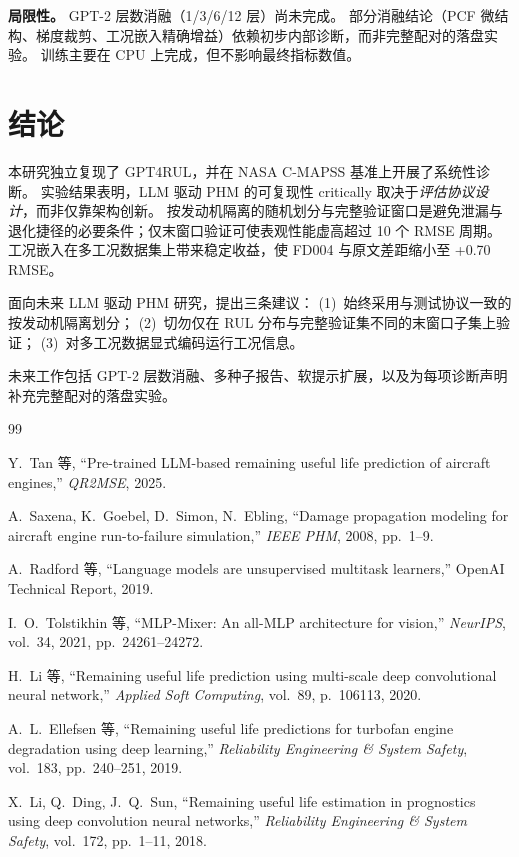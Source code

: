 \documentclass[UTF8,a4paper,10pt,twocolumn]{ctexart}
\begin{document}
\textbf{局限性。}
GPT-2 层数消融（1/3/6/12 层）尚未完成。
部分消融结论（PCF 微结构、梯度裁剪、工况嵌入精确增益）依赖初步内部诊断，而非完整配对的落盘实验。
训练主要在 CPU 上完成，但不影响最终指标数值。

\section{结论}

本研究独立复现了 GPT4RUL，并在 NASA C-MAPSS 基准上开展了系统性诊断。
实验结果表明，LLM 驱动 PHM 的可复现性 critically 取决于\emph{评估协议设计}，而非仅靠架构创新。
按发动机隔离的随机划分与完整验证窗口是避免泄漏与退化捷径的必要条件；仅末窗口验证可使表观性能虚高超过 10 个 RMSE 周期。
工况嵌入在多工况数据集上带来稳定收益，使 FD004 与原文差距缩小至 +0.70 RMSE。

面向未来 LLM 驱动 PHM 研究，提出三条建议：
(1)~始终采用与测试协议一致的按发动机隔离划分；
(2)~切勿仅在 RUL 分布与完整验证集不同的末窗口子集上验证；
(3)~对多工况数据显式编码运行工况信息。

未来工作包括 GPT-2 层数消融、多种子报告、软提示扩展，以及为每项诊断声明补充完整配对的落盘实验。

\begin{thebibliography}{99}

Y.~Tan 等,
``Pre-trained LLM-based remaining useful life prediction of aircraft engines,''
\emph{QR2MSE}, 2025.

A.~Saxena, K.~Goebel, D.~Simon, N.~Ebling,
``Damage propagation modeling for aircraft engine run-to-failure simulation,''
\emph{IEEE PHM}, 2008, pp.~1--9.

A.~Radford 等,
``Language models are unsupervised multitask learners,''
OpenAI Technical Report, 2019.

I.~O.~Tolstikhin 等,
``MLP-Mixer: An all-MLP architecture for vision,''
\emph{NeurIPS}, vol.~34, 2021, pp.~24261--24272.

H.~Li 等,
``Remaining useful life prediction using multi-scale deep convolutional neural network,''
\emph{Applied Soft Computing}, vol.~89, p.~106113, 2020.

A.~L.~Ellefsen 等,
``Remaining useful life predictions for turbofan engine degradation using deep learning,''
\emph{Reliability Engineering \& System Safety}, vol.~183, pp.~240--251, 2019.

X.~Li, Q.~Ding, J.~Q.~Sun,
``Remaining useful life estimation in prognostics using deep convolution neural networks,''
\emph{Reliability Engineering \& System Safety}, vol.~172, pp.~1--11, 2018.

\end{thebibliography}
\end{document}
